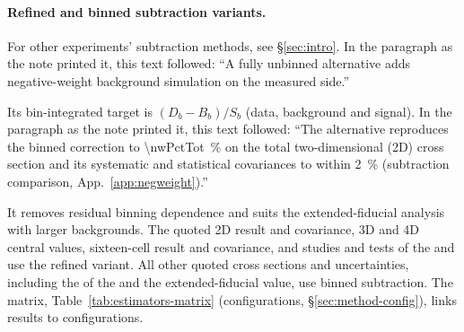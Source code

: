 \paragraph{Refined and binned subtraction variants.} For other experiments' subtraction methods, see \S\ref{sec:intro}. In the paragraph as the note printed it, this text followed: ``A fully unbinned alternative adds negative-weight background simulation on the measured side.''\par Its bin-integrated target is $(D_{b}-B_{b})/S_{b}$ (data, background and signal). In the paragraph as the note printed it, this text followed: ``The alternative reproduces the binned correction to \SI{\nwPctTot}{\percent} on the total two-dimensional (2D) cross section and its systematic and statistical covariances to within \SI{2}{\percent} (subtraction comparison, App.~\ref{app:negweight}).''\par It removes residual binning dependence and suits the extended-fiducial analysis with larger backgrounds. The quoted 2D result and covariance, 3D and 4D central values, sixteen-cell result and covariance, and studies and tests of the \estLowCap{} and \estMultiD{} use the refined variant. All other quoted cross sections and uncertainties, including the \resFiveAxis{} of the \estPurity{} and the extended-fiducial value, use binned subtraction. The matrix, Table~\ref{tab:estimators-matrix} (configurations, \S\ref{sec:method-config}), links results to configurations.


